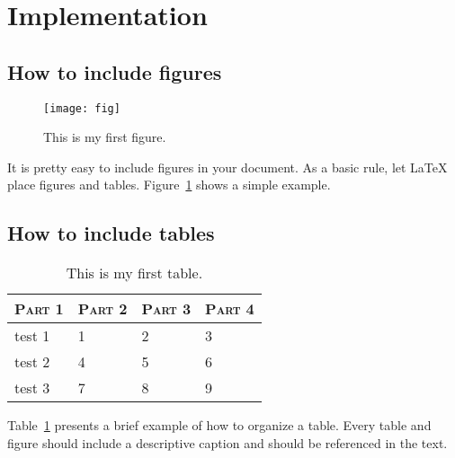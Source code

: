 \section{Implementation}

\subsection{How to include figures}

\begin{figure}
		\centerline{\texttt{[image: fig]}}		
		\caption{This is my first figure.}
		\label{fig:test}
\end{figure}

It is pretty easy to include figures in your document.  As a basic rule, let LaTeX place figures and tables.
Figure~\ref{fig:test} shows a simple example.
 	
\subsection{How to include tables}
	
	\begin{table}[h]
	\begin{center}	
		\begin{tabular}{|l|l|l|l|}
			
			\hline 
				\textsc{Part 1} & 
				\textsc{Part 2} & 
				\textsc{Part 3} & 
				\textsc{Part 4}\\

				\hline 
				\hline 

				test 1 &
				1 &
				2 &
				3 \\
				
				test 2 &
				4 & 
				5&
				6 \\
				
				test 3 &
				7 &
				8 &
				9 \\

				\hline 
				
		\end{tabular}
	\caption{This is my first table.}
	\label{tab:test}
	\end{center}
	\end{table}	

Table~\ref{tab:test} presents a brief example of how to organize a table.  Every
table and figure should include a descriptive caption and should be referenced in the text.
	